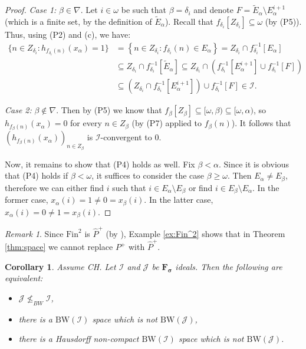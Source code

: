 \documentclass{amsart}
\theoremstyle{plain}
\newtheorem{corollary}[theorem]{Corollary}
\theoremstyle{definition}
\theoremstyle{remark}
\newtheorem{remark}[theorem]{Remark}
\newcommand{\cI}{\mathcal{I}}
\newcommand{\I}{\cI}
\newcommand{\cJ}{\mathcal{J}}
\newcommand{\J}{\cJ}
\newcommand{\Fin}{\mathrm{Fin}}
\newcommand{\BW}{\mathrm{BW}}
\begin{document}
\begin{proof}
\textit{Case 1:} $\beta \in \nabla$. Let $i\in\omega$ be such that $\beta=\delta_i$ and denote $F=\tilde{E}_\alpha\setminus E_\alpha^{i+1}$ (which is a finite set, by the definition of $\tilde{E}_\alpha$). Recall that $f_{\delta_i}[Z_{\delta_i}]\subseteq\omega$ (by (P5)). Thus, using (P2) and (c), we have:
\begin{equation*}
    \begin{split}
        \{n\in Z_{\delta_i}: h_{f_{\delta_i}(n)}(x_\alpha)=1\}
        &
        =\left\{ n \in Z_{\delta_i}: f_{\delta_i}(n)\in E_\alpha\right\} =Z_{\delta_i} \cap f^{-1}_{\delta_i}[E_\alpha]
        \\&
        \subseteq Z_{\delta_i} \cap f^{-1}_{\delta_i}[\tilde{E}_\alpha]\subseteq Z_{\delta_i} \cap \left(f^{-1}_{\delta_i}[E^{i+1}_\alpha]\cup f^{-1}_{\delta_i}[F]\right)
        \\&
        \subseteq \left(Z_{\delta_i}\cap f^{-1}_{\delta_i}[E^{i+1}_\alpha]\right)\cup f^{-1}_{\delta_i}[F]\in\I.
 \end{split}
 \end{equation*} 

\smallskip

\textit{Case 2:} $\beta \notin \nabla$. Then by (P5) we know that $f_\beta[Z_\beta]\subseteq[\omega,\beta)\subseteq[\omega,\alpha)$, so $h_{f_\beta(n)}(x_\alpha)=0$ for every $n\in Z_\beta$ (by (P7) applied to $f_\beta(n)$). It follows that $(h_{f_\beta(n)}(x_\alpha))_{n\in Z_\beta}$ is $\I$-convergent to $0$.

\smallskip

Now, it remains to show that (P4) holds as well. Fix $\beta<\alpha$. Since it is obvious that (P4) holds if $\beta<\omega$, it suffices to consider the case $\beta\geq\omega$. Then $E_\alpha\neq E_\beta$, therefore we can either find $i$ such that $i \in E_\alpha\setminus E_\beta$ or find $i \in E_\beta \setminus E_\alpha$. In the former case, $x_\alpha(i)=1\neq 0 =x_\beta(i)$. In the latter case, $x_\alpha(i)=0\neq 1=x_\beta(i)$.
\end{proof}

\begin{remark}
Since $\Fin^2$ is $\widehat{P}^+$ (by \cite[Proposition 2.6(2)]{zbMATH07566290}), Example \ref{ex:Fin^2} shows that in Theorem \ref{thm:space} we cannot replace $P^+$ with $\widehat{P}^+$.
\end{remark}

\begin{corollary}
\label{cor:spaces_for_Fsigma}
Assume CH. Let $\I$ and $\J$ be $\mathbf{F_\sigma}$ ideals. Then the following are equivalent:
\begin{itemize}
    \item[(a)] $\J\not\leq_{BW}\I$,
    \item[(b)] there is a $\BW(\I)$ space which is not $\BW(\J)$,
    \item[(c)] there is a Hausdorff non-compact $\BW(\I)$ space which is not $\BW(\J)$.
\end{itemize}
\end{corollary}
\end{document}
